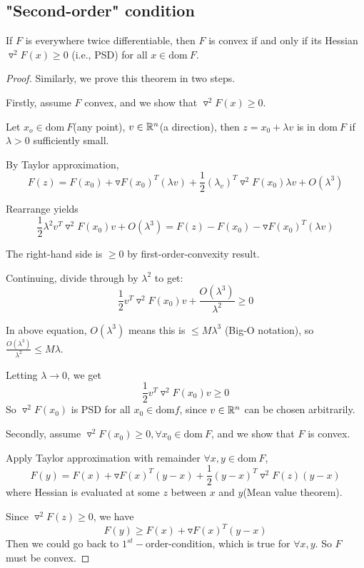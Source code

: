 \subsection{"Second-order" condition}

\begin{theorem}
	If $F$ is everywhere twice differentiable, then $F$ is convex if and only if its Hessian $\triangledown^2F(x)\geq 0$ (i.e., PSD) for all $x\in \text{dom}\ F$.
\end{theorem}

\begin{proof}

Similarly, we prove this theorem in two steps.

Firstly, assume $F$ convex, and we show that $\triangledown^2F(x)\geq 0$.

Let $x_o \in \text{dom}\ F$(any point), $v\in \mathbb{R}^n$(a direction), then $z = x_0 + \lambda v$ is in $\text{dom}\ F$ if $\lambda > 0$ sufficiently small. 

By Taylor approximation, 
$$F(z) = F(x_0) + \triangledown F(x_0)^T(\lambda v) + \frac{1}{2}(\lambda_v)^T\triangledown^2F(x_0)\lambda v + O(\lambda^3)$$

Rearrange yields 
$$\frac{1}{2}\lambda^2v^T\triangledown^2F(x_0)v+O(\lambda^3) = F(z) - F(x_0) - \triangledown F(x_0)^T(\lambda v)$$

The right-hand side is $\geq 0$ by first-order-convexity result.

Continuing, divide through by $\lambda^2$ to get:
$$\frac{1}{2}v^T\triangledown^2F(x_0)v + \frac{O(\lambda^3)}{\lambda^2} \geq 0$$

In above equation, $O(\lambda^3)$ means this is $\leq M\lambda^3$ (Big-O notation), so $\frac{O(\lambda^3)}{\lambda^2} \leq M\lambda$.

Letting $\lambda\rightarrow 0$, we get 
$$\frac{1}{2}v^T\triangledown^2F(x_0)v\geq 0$$
So $\triangledown^2F(x_0)$ is PSD for all $x_0 \in \text{dom}f$, since $v\in \mathbb{R}^n$ can be chosen arbitrarily.


\vspace{0.3cm}
Secondly, assume $\triangledown^2F(x_0)\geq 0, \forall x_0\in \text{dom}\ F$, and we show that $F$ is convex.

Apply Taylor approximation with remainder $\forall x,y\in \text{dom}\ F$, 
$$F(y) =F(x) + \triangledown F(x)^T(y-x) + \frac{1}{2}(y-x)^T\triangledown^2F(z)(y-x)$$
where Hessian is evaluated at some $z$ between $x$ and $y$(Mean value theorem).

Since $\triangledown^2F(z)\geq 0$, we have
$$F(y) \geq F(x) + \triangledown F(x)^T (y-x)$$
Then we could go back to $1^{st}-$order-condition, which is true for $\forall x,y$. So $F$ must be convex. 
\end{proof}



